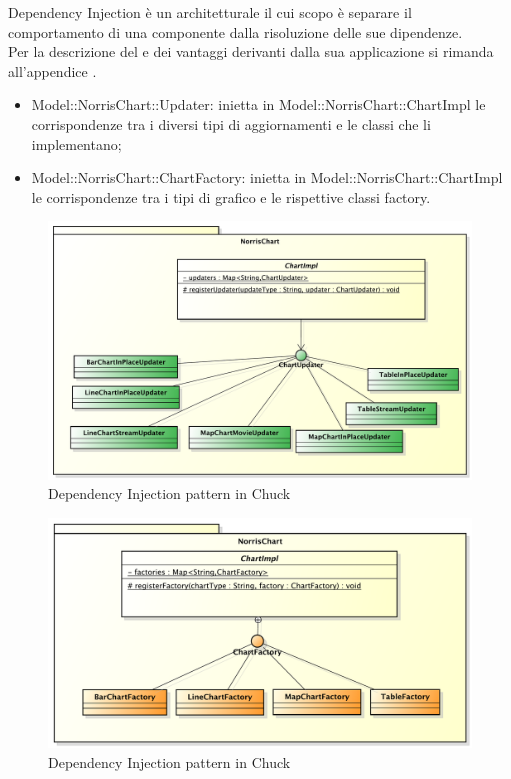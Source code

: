 			Dependency Injection è un  architetturale il cui scopo è separare il comportamento di una componente dalla risoluzione delle sue dipendenze.\\
			Per la descrizione del  e dei vantaggi derivanti dalla sua applicazione si rimanda all'appendice .
				\begin{itemize}
					\item Model::NorrisChart::Updater: inietta in Model::NorrisChart::ChartImpl le corrispondenze tra i diversi tipi di aggiornamenti e le classi che li implementano;
					\item Model::NorrisChart::ChartFactory: inietta in Model::NorrisChart::ChartImpl le corrispondenze tra i tipi di grafico e le rispettive classi factory.
					\end{itemize}
				\begin{figure}[H]\centering
	        		\includegraphics[width=\textwidth]{SpecificaTecnica/Pics/DesignPatternNorris/DependencyInjection1}
	        		\caption{Dependency Injection pattern in Chuck}
	    		\end{figure}
	    		\begin{figure}[H]\centering
	        		\includegraphics[width=\textwidth]{SpecificaTecnica/Pics/DesignPatternNorris/DependencyInjection2}
	        		\caption{Dependency Injection pattern in Chuck}
	    		\end{figure}
	    		
